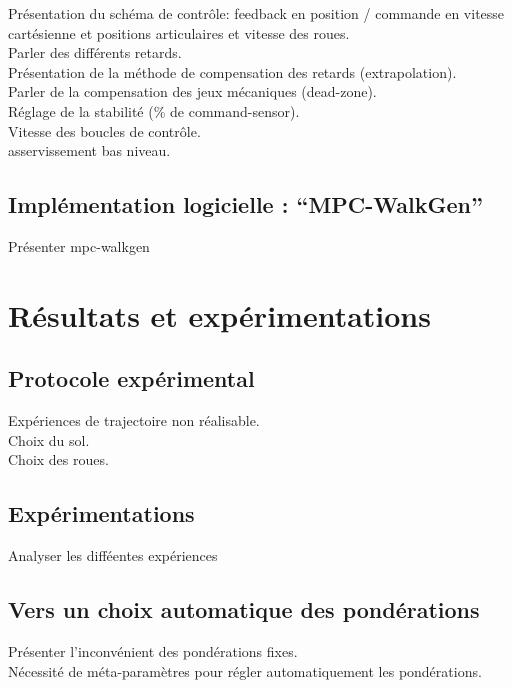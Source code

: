 Présentation du schéma de contrôle: feedback en position / commande en vitesse cartésienne et positions articulaires et vitesse des roues.\\
Parler des différents retards.\\
Présentation de la méthode de compensation des retards (extrapolation).\\
Parler de la compensation des jeux mécaniques (dead-zone).\\
Réglage de la stabilité (\% de command-sensor).\\
Vitesse des boucles de contrôle.\\
asservissement bas niveau.

\subsection{Implémentation logicielle : ``MPC-WalkGen''}

Présenter mpc-walkgen

\section{Résultats et expérimentations}
\subsection{Protocole expérimental}

Expériences de trajectoire non réalisable.\\
Choix du sol.\\
Choix des roues.

\subsection{Expérimentations}

Analyser les difféentes expériences

\subsection{Vers un choix automatique des pondérations}

Présenter l'inconvénient des pondérations fixes.\\
Nécessité de méta-paramètres pour régler automatiquement les pondérations.
